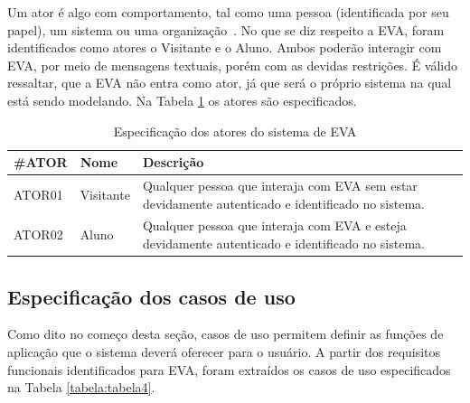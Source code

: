 Um ator é algo com comportamento, tal como uma pessoa (identificada por seu papel), um sistema ou uma organização~\cite{CraigLarman}. No que se diz respeito a EVA, foram identificados como atores o Visitante e o Aluno. Ambos poderão interagir com EVA, por meio de mensagens textuais, porém com as devidas restrições. É válido ressaltar, que a EVA não entra como ator, já que será o próprio sistema na qual está sendo modelando. Na Tabela \ref{tabela:tabela3} os atores são especificados.

\begin{table}[htb!]
\caption{Especificação dos atores do sistema de EVA}
\label{tabela:tabela3}
\center
\footnotesize
\begin{tabular}{|p{2cm}|p{3cm}|p{7.5cm}|}
  \hline
   \textbf{\#ATOR} & \textbf{Nome}  & \textbf{Descrição}  \\
   \hline
    ATOR01 & Visitante & Qualquer pessoa que interaja com EVA sem estar devidamente autenticado e identificado no sistema. \\
   \hline
    ATOR02 & Aluno & Qualquer pessoa que interaja com EVA e esteja devidamente autenticado e identificado no sistema. \\
   \hline
\end{tabular}
\end{table}

\subsection{Especificação dos casos de uso}

Como dito no começo desta seção, casos de uso permitem definir as funções de aplicação que o sistema deverá oferecer para o usuário. A partir dos requisitos funcionais identificados para EVA, foram extraídos os casos de uso especificados na Tabela \ref{tabela:tabela4}.

